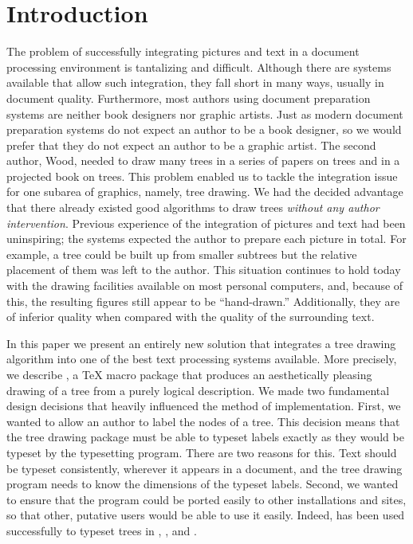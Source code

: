 \section{Introduction}

The problem of successfully integrating pictures and text in a
document processing environment is tantalizing and difficult.
Although there are systems available that allow such integration, they
fall short in many ways, usually in document quality. Furthermore,
most authors using document  preparation systems are neither book 
designers nor graphic artists.  Just as modern document preparation
systems do not expect an author to be a book designer, so we would
prefer that they do not expect an author to be a graphic artist. The
second author, Wood, needed to draw many trees in a series of papers
on trees and in a projected book on trees. This problem enabled us
to tackle the integration issue for one subarea of graphics, namely,
tree drawing. We had the decided advantage that there already existed good
algorithms to draw trees {\em without any author intervention}.
Previous experience of the integration of pictures and text had been
uninspiring; the  systems expected the author to prepare each picture
in total. For example, a tree could be built up from smaller
subtrees but the relative placement of them was left to the author.
This situation continues to hold today with the drawing facilities
available on most personal computers, and, because of this, the
resulting figures still appear to be ``hand-drawn.'' Additionally,
they are of inferior quality when compared with the quality of
the surrounding text.

In this paper we present an entirely new solution that integrates
a tree drawing algorithm into one of the best text processing
systems available. More precisely, we  describe \TreeTeX{}, a
\TeX{} macro package that produces an aesthetically pleasing
drawing of a tree from a purely logical description.
We made two fundamental design
decisions that heavily influenced the method of implementation.
First, we wanted to allow an author to label the nodes of a tree.
This decision means that the tree drawing package must be able to
typeset labels exactly as they would be typeset by the typesetting
program. There are two reasons for this. Text should be typeset
consistently, wherever it appears in a document, and the tree
drawing program needs to know the dimensions of the typeset labels.
Second, we wanted to ensure that the program could be ported
easily to other installations and sites, so that other, putative
users would be able to use it easily.
Indeed, \TreeTeX{} has been used successfully to typeset trees in
\cite{BaezaTrees}, \cite{KWIFIP}, and \cite{OAPD}.

